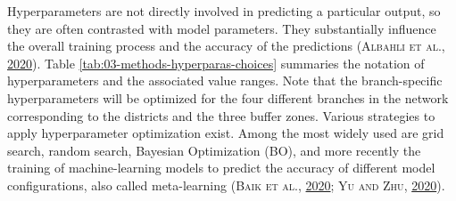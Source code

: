 \documentclass[a4paper,11pt]{article}
\begin{document}
Hyperparameters are not directly involved in predicting a particular output, so
they are often contrasted with model parameters. They substantially influence
the overall training process and the accuracy of the predictions \textsc{(\textnormal{\textsc{Albahli} \textsc{et al.}}, \textnormal{\protect\hyperlink{ref-albahli2020}{2020}})}.
Table \ref{tab:03-methods-hyperparas-choices} summaries the notation of hyperparameters
and the associated value ranges. Note that the branch-specific hyperparameters will
be optimized for the four different branches in the network corresponding to
the districts and the three buffer zones. Various strategies to apply hyperparameter
optimization exist. Among the most widely used are grid search, random search,
Bayesian Optimization (BO), and more recently the training of machine-learning
models to predict the accuracy of different model configurations, also called
meta-learning \textsc{(\textnormal{\textsc{Baik} \textsc{et al.}}, \textnormal{\protect\hyperlink{ref-baik2020}{2020}}; \textnormal{\textsc{Yu} and \textsc{Zhu}}, \textnormal{\protect\hyperlink{ref-yu2020}{2020}})}.

\newpage
\end{document}
